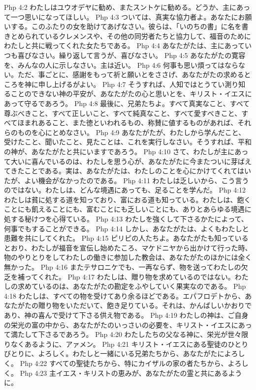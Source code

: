 Php 4:2  わたしはユウオデヤに勧め、またスントケに勧める。どうか、主にあって一つ思いになってほしい。
Php 4:3  ついては、真実な協力者よ。あなたにお願いする。このふたりの女を助けてあげなさい。彼らは、「いのちの書」に名を書きとめられているクレメンスや、その他の同労者たちと協力して、福音のためにわたしと共に戦ってくれた女たちである。
Php 4:4  あなたがたは、主にあっていつも喜びなさい。繰り返して言うが、喜びなさい。
Php 4:5  あなたがたの寛容を、みんなの人に示しなさい。主は近い。
Php 4:6  何事も思い煩ってはならない。ただ、事ごとに、感謝をもって祈と願いとをささげ、あなたがたの求めるところを神に申し上げるがよい。
Php 4:7  そうすれば、人知ではとうてい測り知ることのできない神の平安が、あなたがたの心と思いとを、キリスト・イエスにあって守るであろう。
Php 4:8  最後に、兄弟たちよ。すべて真実なこと、すべて尊ぶべきこと、すべて正しいこと、すべて純真なこと、すべて愛すべきこと、すべてほまれあること、また徳といわれるもの、称賛に値するものがあれば、それらのものを心にとめなさい。
Php 4:9  あなたがたが、わたしから学んだこと、受けたこと、聞いたこと、見たことは、これを実行しなさい。そうすれば、平和の神が、あなたがたと共にいますであろう。
Php 4:10  さて、わたしが主にあって大いに喜んでいるのは、わたしを思う心が、あなたがたに今またついに芽ばえてきたことである。実は、あなたがたは、わたしのことを心にかけてくれてはいたが、よい機会がなかったのである。
Php 4:11  わたしは乏しいから、こう言うのではない。わたしは、どんな境遇にあっても、足ることを学んだ。
Php 4:12  わたしは貧に処する道を知っており、富におる道も知っている。わたしは、飽くことにも飢えることにも、富むことにも乏しいことにも、ありとあらゆる境遇に処する秘けつを心得ている。
Php 4:13  わたしを強くして下さるかたによって、何事でもすることができる。
Php 4:14  しかし、あなたがたは、よくもわたしと患難を共にしてくれた。
Php 4:15  ピリピの人たちよ。あなたがたも知っているとおり、わたしが福音を宣伝し始めたころ、マケドニヤから出かけて行った時、物のやりとりをしてわたしの働きに参加した教会は、あなたがたのほかには全く無かった。
Php 4:16  またテサロニケでも、一再ならず、物を送ってわたしの欠乏を補ってくれた。
Php 4:17  わたしは、贈り物を求めているのではない。わたしの求めているのは、あなたがたの勘定をふやしていく果実なのである。
Php 4:18  わたしは、すべての物を受けてあり余るほどである。エパフロデトから、あなたがたの贈り物をいただいて、飽き足りている。それは、かんばしいかおりであり、神の喜んで受けて下さる供え物である。
Php 4:19  わたしの神は、ご自身の栄光の富の中から、あなたがたのいっさいの必要を、キリスト・イエスにあって満たして下さるであろう。
Php 4:20  わたしたちの父なる神に、栄光が世々限りなくあるように、アァメン。
Php 4:21  キリスト・イエスにある聖徒のひとりびとりに、よろしく。わたしと一緒にいる兄弟たちから、あなたがたによろしく。
Php 4:22  すべての聖徒たちから、特にカイザルの家の者たちから、よろしく。
Php 4:23  主イエス・キリストの恵みが、あなたがたの霊と共にあるように。


